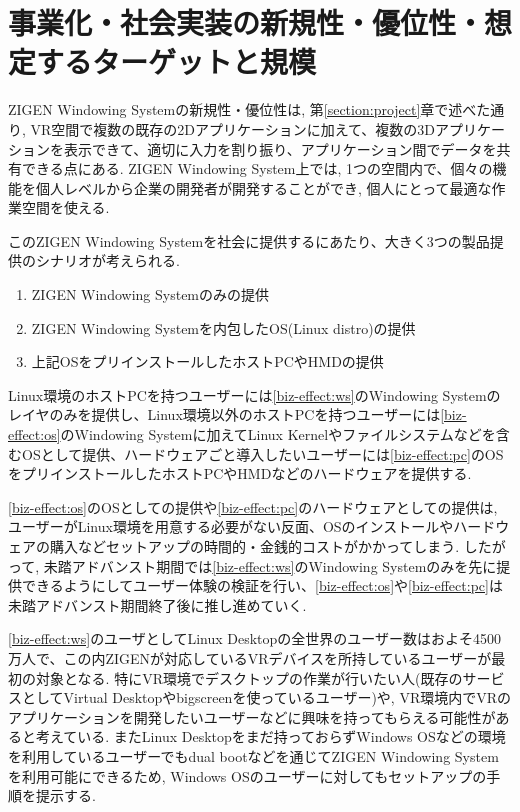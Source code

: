 \section{事業化・社会実装の新規性・優位性・想定するターゲットと規模}
\label{section:biz-effect}


ZIGEN Windowing Systemの新規性・優位性は, 第\ref{section:project}章で述べた通り, VR空間で複数の既存の2Dアプリケーションに加えて、複数の3Dアプリケーションを表示できて、適切に入力を割り振り、アプリケーション間でデータを共有できる点にある.
ZIGEN Windowing System上では, 1つの空間内で、個々の機能を個人レベルから企業の開発者が開発することができ, 個人にとって最適な作業空間を使える.

このZIGEN Windowing Systemを社会に提供するにあたり、大きく3つの製品提供のシナリオが考えられる.
\begin{enumerate}[label=(\alph*)]
  \item \label{biz-effect:ws} ZIGEN Windowing Systemのみの提供
  \item \label{biz-effect:os} ZIGEN Windowing Systemを内包したOS(Linux distro)の提供
  \item \label{biz-effect:pc} 上記OSをプリインストールしたホストPCやHMDの提供
\end{enumerate}

Linux環境のホストPCを持つユーザーには\ref{biz-effect:ws}のWindowing Systemのレイヤのみを提供し、Linux環境以外のホストPCを持つユーザーには\ref{biz-effect:os}のWindowing Systemに加えてLinux Kernelやファイルシステムなどを含むOSとして提供、ハードウェアごと導入したいユーザーには\ref{biz-effect:pc}のOSをプリインストールしたホストPCやHMDなどのハードウェアを提供する.

\ref{biz-effect:os}のOSとしての提供や\ref{biz-effect:pc}のハードウェアとしての提供は, ユーザーがLinux環境を用意する必要がない反面、OSのインストールやハードウェアの購入などセットアップの時間的・金銭的コストがかかってしまう.
したがって, 未踏アドバンスト期間では\ref{biz-effect:ws}のWindowing Systemのみを先に提供できるようにしてユーザー体験の検証を行い、\ref{biz-effect:os}や\ref{biz-effect:pc}は未踏アドバンスト期間終了後に推し進めていく.

\ref{biz-effect:ws}のユーザとしてLinux Desktopの全世界のユーザー数はおよそ4500万人で、この内ZIGENが対応しているVRデバイスを所持しているユーザーが最初の対象となる.
特にVR環境でデスクトップの作業が行いたい人(既存のサービスとしてVirtual Desktopやbigscreenを使っているユーザー)や, VR環境内でVRのアプリケーションを開発したいユーザーなどに興味を持ってもらえる可能性があると考えている.
またLinux Desktopをまだ持っておらずWindows OSなどの環境を利用しているユーザーでもdual bootなどを通じてZIGEN Windowing Systemを利用可能にできるため, Windows OSのユーザーに対してもセットアップの手順を提示する.

